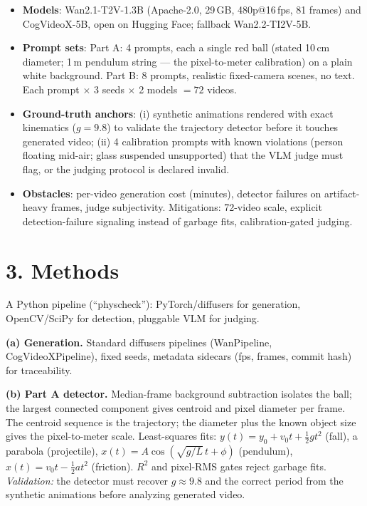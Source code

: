 \documentclass[10pt,a4paper]{article}
\begin{document}
\begin{itemize}
  \item \textbf{Models}: Wan2.1-T2V-1.3B (Apache-2.0, 29\,GB, 480p@16\,fps, 81 frames)
        and CogVideoX-5B, open on Hugging Face; fallback Wan2.2-TI2V-5B.
  \item \textbf{Prompt sets}: Part A: 4 prompts, each a single red ball (stated 10\,cm
        diameter; 1\,m pendulum string --- the pixel-to-meter calibration) on a plain
        white background. Part B: 8 prompts, realistic fixed-camera scenes, no text.
        Each prompt $\times$ 3 seeds $\times$ 2 models $=72$ videos.
  \item \textbf{Ground-truth anchors}: (i) synthetic animations rendered with exact
        kinematics ($g{=}9.8$) to validate the trajectory detector before it touches
        generated video; (ii) 4 calibration prompts with known violations (person
        floating mid-air; glass suspended unsupported) that the VLM judge must flag, or
        the judging protocol is declared invalid.
  \item \textbf{Obstacles}: per-video generation cost (minutes), detector failures on
        artifact-heavy frames, judge subjectivity. Mitigations: 72-video scale,
        explicit detection-failure signaling instead of garbage fits, calibration-gated
        judging.
\end{itemize}

\section*{3. Methods}

A Python pipeline (``physcheck''): PyTorch/diffusers for generation, OpenCV/SciPy for
detection, pluggable VLM for judging.

\textbf{(a) Generation.} Standard diffusers pipelines (WanPipeline, CogVideoXPipeline),
fixed seeds, metadata sidecars (fps, frames, commit hash) for traceability.

\textbf{(b) Part A detector.} Median-frame background subtraction isolates the ball; the
largest connected component gives centroid and pixel diameter per frame. The centroid
sequence is the trajectory; the diameter plus the known object size gives the
pixel-to-meter scale. Least-squares fits: $y(t)=y_0+v_0t+\tfrac12 gt^2$ (fall), a
parabola (projectile), $x(t)=A\cos(\sqrt{g/L}\,t+\phi)$ (pendulum), $x(t)=v_0t-\tfrac12
at^2$ (friction). $R^2$ and pixel-RMS gates reject garbage fits. \emph{Validation:} the
detector must recover $g{\approx}9.8$ and the correct period from the synthetic
animations before analyzing generated video.
\end{document}
